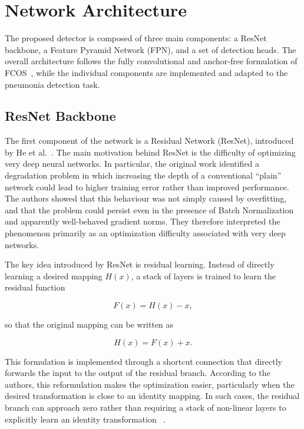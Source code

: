 \documentclass[11pt,a4paper]{article}
\begin{document}



\section{Network Architecture}
\label{sec:architecture}

The proposed detector is composed of three main components: a ResNet backbone,
a Feature Pyramid Network (FPN), and a set of detection heads. The overall
architecture follows the fully convolutional and anchor-free formulation of
FCOS~\cite{tian2019fcos}, while the individual components are implemented and
adapted to the pneumonia detection task.

\subsection{ResNet Backbone}
\label{subsec:resnet_backbone}

The first component of the network is a Residual Network (ResNet), introduced
by He et al.~\cite{he2016resnet}. The main motivation behind ResNet is the
difficulty of optimizing very deep neural networks. In particular, the
original work identified a degradation problem in which increasing the depth
of a conventional ``plain'' network could lead to higher training error
rather than improved performance. The authors showed that this behaviour was
not simply caused by overfitting, and that the problem could persist even in
the presence of Batch Normalization and apparently well-behaved gradient
norms. They therefore interpreted the phenomenon primarily as an optimization
difficulty associated with very deep networks.

The key idea introduced by ResNet is residual learning. Instead of directly
learning a desired mapping $H(x)$, a stack of layers is trained to learn the
residual function

\begin{equation}
F(x) = H(x) - x,
\end{equation}

so that the original mapping can be written as

\begin{equation}
H(x) = F(x) + x.
\end{equation}

This formulation is implemented through a shortcut connection that directly
forwards the input to the output of the residual branch. According to the
authors, this reformulation makes the optimization easier, particularly when
the desired transformation is close to an identity mapping. In such cases,
the residual branch can approach zero rather than requiring a stack of
non-linear layers to explicitly learn an identity transformation
~\cite{he2016resnet}.
\end{document}
